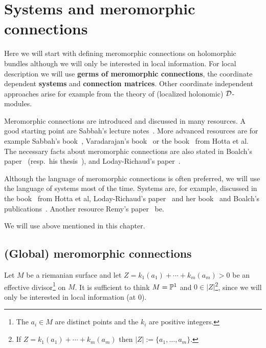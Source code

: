 \chapter{Systems and meromorphic connections}
Here we will start with defining meromorphic connections on holomorphic bundles
although we will only be interested in local information.
For local description we will use \textbf{germs of meromorphic connections}, the
coordinate dependent \textbf{systems} and \textbf{connection matrices}.
Other coordinate independent approaches arise for example from the theory of
(localized holonomic) $\cD$-modules.

Meromorphic connections are introduced and discussed in many resources.
A good starting point are Sabbah's lecture notes~\cite{sabbah_cimpa90}.
More advanced resources are for example
Sabbah's book~\cite{sabbah2007isomonodromic},
Varadarajan's book~\cite{Varadarajan96linearmeromorphic} or the
book~\cite{hotta2008} from Hotta et al.
The necessary facts about meromorphic connections are also stated in
Boalch's paper~\cite{boalch} (resp.\ his thesis~\cite{thboalch}),
and Loday-Richaud's paper~\cite{Loday1994}.

Although the language of meromorphic connections is often preferred, we will
use the language of systems most of the time.
Systems are, for example, discussed in the book~\cite{hotta2008} from Hotta et
al, Loday-Richaud's paper~\cite{Loday1994} and her book~\cite{Loday2014} and
Boalch's publications~\cite{boalch,thboalch}. Another resource 
Remy's paper~\cite{Remy2014} be.

We will use  above mentioned  in this
chapter.

\section{(Global) meromorphic connections}
Let $M$ be a riemanian surface and let $Z=k_1(a_1)+\cdots+k_m(a_m)>0$ be an
effective divisor\footnote{The $a_i\in M$ are distinct points and the $k_i$ are
positive integers.} on $M$.
It is sufficient to think $M=\P^1$ and $0\in|Z|$\footnote{If
$Z=k_1(a_1)+\cdots+k_m(a_m)$ then $|Z|:=\{a_1,\dots,a_m\}$.}, since we will
only be interested in local information (at $0$).

